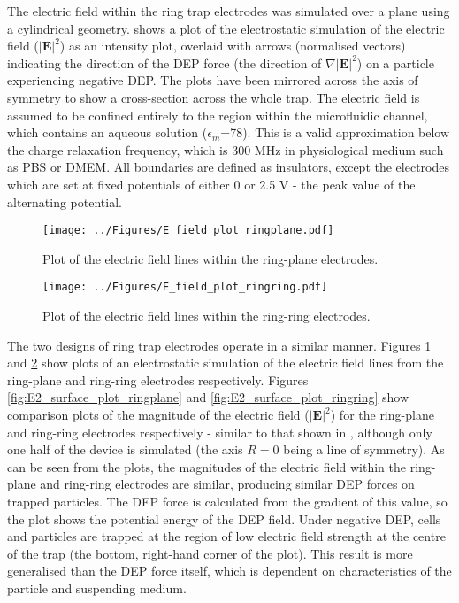 The electric field within the ring trap electrodes was simulated over a plane using a cylindrical geometry.  shows a plot of the electrostatic simulation of the electric field ($\left | \textbf{E} \right | ^{2}$) as an intensity plot, overlaid with arrows (normalised vectors) indicating the direction of the DEP force (the direction of $\nabla \left | \textbf{E} \right | ^{2}$) on a particle experiencing negative DEP. The plots have been mirrored across the axis of symmetry to show a cross-section across the whole trap. The electric field is assumed to be confined entirely to the region within the microfluidic channel, which contains an aqueous solution ($\epsilon_{m}$=78). This is a valid approximation below the charge relaxation frequency, which is 300 MHz in physiological medium such as PBS or DMEM. All boundaries are defined as insulators, except the electrodes which are set at fixed potentials of either 0 or 2.5 V - the peak value of the alternating potential.


\begin{figure}[p]
 \centering
 \texttt{[image: ../Figures/E\_field\_plot\_ringplane.pdf]}
 \caption[Plot of the electric field lines within the ring-plane electrodes.]{Plot of the electric field lines within the ring-plane electrodes.}
 \label{fig:E_field_plot_ringplane}
\end{figure}

\begin{figure}[p]
 \centering
 \texttt{[image: ../Figures/E\_field\_plot\_ringring.pdf]}
 \caption[Plot of the electric field lines within the ring-ring electrodes.]{Plot of the electric field lines within the ring-ring electrodes.}
 \label{fig:E_field_plot_ringring}
\end{figure}

The two designs of ring trap electrodes operate in a similar manner. Figures \ref{fig:E_field_plot_ringplane} and \ref{fig:E_field_plot_ringring} show plots of an electrostatic simulation of the electric field lines from the ring-plane and ring-ring electrodes respectively. Figures \ref{fig:E2_surface_plot_ringplane} and \ref{fig:E2_surface_plot_ringring} show comparison plots of the magnitude of the electric field ($\left | \textbf{E} \right | ^{2}$) for the ring-plane and ring-ring electrodes respectively - similar to that shown in , although only one half of the device is simulated (the axis $R=0$ being a line of symmetry). As can be seen from the plots, the magnitudes of the electric field within the ring-plane and ring-ring electrodes are similar, producing similar DEP forces on trapped particles. The DEP force is calculated from the gradient of this value, so the plot shows the potential energy of the DEP field. Under negative DEP, cells and particles are trapped at the region of low electric field strength at the centre of the trap (the bottom, right-hand corner of the plot). This result is more generalised than the DEP force itself, which is dependent on characteristics of the particle and suspending medium. 

